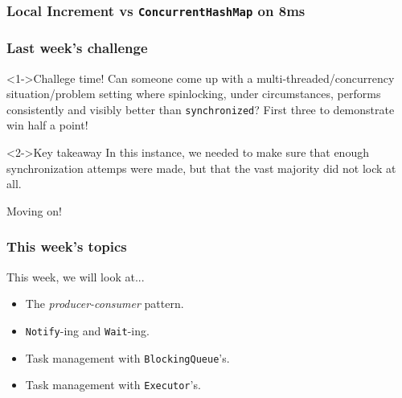 \documentclass[xcolor={dvipsnames,svgnames},aspectratio=169]{beamer}
\begin{document}
\begin{frame}[fragile]
  \frametitle{Local Increment vs \texttt{ConcurrentHashMap} on 8ms}

  \begin{center}
  \end{center}
\end{frame}



\begin{frame}[fragile]
  \frametitle{Last week's challenge}

  \begin{block}<1->{\faPuzzlePiece \quad Challege time!}
    Can someone come up with a multi-threaded/concurrency situation/problem setting
    where spinlocking, under circumstances, performs consistently and visibly
    better than \texttt{synchronized}? First three to demonstrate win half a point!
  \end{block}

  \vspace{0.4cm}

  \begin{block}<2->{\faLightbulb \quad Key takeaway}
    In this instance, we needed to make sure that enough synchronization attemps
    were made, but that the vast majority did not lock at all.
  \end{block}
\end{frame}

\begin{frame}[fragile]
  \Large{Moving on!}
\end{frame}

\begin{frame}[fragile]
  \frametitle{This week's topics}

  This week, we will look at...

  \begin{itemize}
  \item[\faBook]<1-> The \emph{producer-consumer} pattern.
  \item[\faBook]<1-> \texttt{Notify}-ing and \texttt{Wait}-ing.
  \item[\faBook]<1-> Task management with \texttt{BlockingQueue}'s.
  \item[\faBook]<1-> Task management with \texttt{Executor}'s.
  \end{itemize}
\end{frame}
\end{document}
